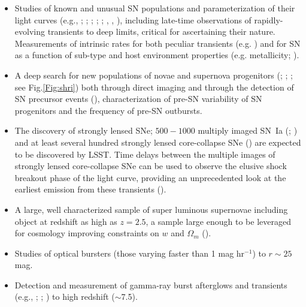 \begin{itemize}
\item Studies of known and unusual SN populations and parameterization of their light curves (e.g., \cite{1998ApJ...495..617H};
 \cite{2003ApJ...590..944W}; \cite{2007ApJ...667L..37H}; \cite{2008ApJ...686..749K}; \cite{2009ApJ...700.1097H}; \cite{2012ApJ...748..127F}, \cite{2014ApJS..213...19B},
 \cite{2017Natur.551..210A}), including late-time observations of rapidly-evolving transients to deep limits, critical for ascertaining their nature. Measurements of intrinsic rates for both peculiar transients (e.g. \cite{2014ApJ...794...23D}) and for SN as a function of sub-type and host environment properties (e.g. metallicity; \cite{2017ApJ...837..120G}).

\item A deep search for new populations of novae and supernova progenitors
      (\cite{2009ARA&A..47...63S}; \cite{2009ApJ...705.1364T}; \cite{2011MNRAS.415..773S}; see Fig.\ref{Fig:shri}) both through direct imaging and through the detection of SN precursor events (\cite{2013Natur.494...65O}), characterization of pre-SN variability of SN progenitors and the frequency of pre-SN outbursts.

\item The discovery of strongly lensed SNe; $500-1000$ multiply imaged SN~Ia (\cite{2017ApJ...834L...5G};
\cite{2017arXiv170800003G}) and at least several hundred strongly lensed core-collapse SNe (\cite{2010MNRAS.405.2579O})
are expected to be discovered by LSST. Time delays between the multiple images of strongly lensed core-collapse
SNe can be used to observe the elusive shock breakout phase of the light curve, providing an unprecedented look
at the earliest emission from these transients (\cite{2017arXiv171100183S}).

\item A large, well characterized sample of super luminous supernovae
including object at redshift as high as $z=2.5$, a sample large enough to be leveraged for cosmology  improving constraints on $w$ and $\Omega_m$ (\cite{Scovacricchi2015}).

\item Studies of optical bursters (those varying faster than 1 mag hr$^{-1}$) to $r\sim25$ mag.

\item Detection and measurement of gamma-ray burst afterglows and transients
      (e.g., \cite{2004IJMPA..19.2385Z}; \cite{2006ApJ...642..354Z}; \cite{2010ApJ...720.1513K}) to high redshift ($\sim$7.5).


\end{itemize}
